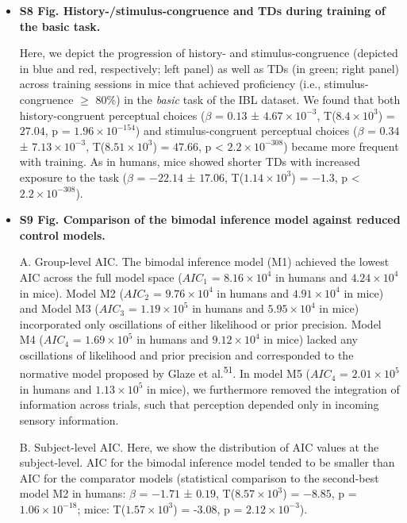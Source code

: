 \documentclass[
]{article}
\begin{document}
\begin{itemize}
\item \textbf{S8 Fig. History-/stimulus-congruence and TDs during training of the basic task.}

Here, we depict the progression of history- and stimulus-congruence
(depicted in blue and red, respectively; left panel) as well as TDs (in
green; right panel) across training sessions in mice that achieved
proficiency (i.e., stimulus-congruence \(\geq\) 80\%) in the
\emph{basic} task of the IBL dataset. We found that both
history-congruent perceptual choices (\(\beta\) = \(0.13\) ±
\(\ensuremath{4.67\times 10^{-3}}\),
T(\(\ensuremath{8.4\times 10^{3}}\)) = \(27.04\), p =
\(\ensuremath{1.96\times 10^{-154}}\)) and stimulus-congruent perceptual
choices (\(\beta\) = \(0.34\) ± \(\ensuremath{7.13\times 10^{-3}}\),
T(\(\ensuremath{8.51\times 10^{3}}\)) = \(47.66\), p < \(\ensuremath{2.2\times 10^{-308}}\)) became
more frequent with training. As in humans, mice showed shorter TDs with
increased exposure to the task (\(\beta\) = \(-22.14\) ± \(17.06\),
T(\(\ensuremath{1.14\times 10^{3}}\)) = \(-1.3\), p < \(\ensuremath{2.2\times 10^{-308}}\)).

\item \textbf{S9 Fig. Comparison of the bimodal inference model against reduced control models.}

A. Group-level AIC. The bimodal inference model (M1) achieved the lowest
AIC across the full model space (\(AIC_1\) =
\(\ensuremath{8.16\times 10^{4}}\) in humans and
\(\ensuremath{4.24\times 10^{4}}\) in mice). Model M2 (\(AIC_2\) =
\(\ensuremath{9.76\times 10^{4}}\) in humans and
\(\ensuremath{4.91\times 10^{4}}\) in mice) and Model M3 (\(AIC_3\) =
\(\ensuremath{1.19\times 10^{5}}\) in humans and
\(\ensuremath{5.95\times 10^{4}}\) in mice) incorporated only
oscillations of either likelihood or prior precision. Model M4
(\(AIC_4\) = \(\ensuremath{1.69\times 10^{5}}\) in humans and
\(\ensuremath{9.12\times 10^{4}}\) in mice) lacked any oscillations of
likelihood and prior precision and corresponded to the normative model
proposed by Glaze et al.\textsuperscript{51}. In model M5 (\(AIC_4\) =
\(\ensuremath{2.01\times 10^{5}}\) in humans and
\(\ensuremath{1.13\times 10^{5}}\) in mice), we furthermore removed the
integration of information across trials, such that perception depended
only in incoming sensory information.

B. Subject-level AIC. Here, we show the distribution of AIC values at
the subject-level. AIC for the bimodal inference model tended to be
smaller than AIC for the comparator models (statistical comparison to
the second-best model M2 in humans: \(\beta\) = \(-1.71\) ± \(0.19\),
T(\(\ensuremath{8.57\times 10^{3}}\)) = \(-8.85\), p =
\(\ensuremath{1.06\times 10^{-18}}\); mice:
T(\(\ensuremath{1.57\times 10^{3}}\)) = -3.08, p =
\(\ensuremath{2.12\times 10^{-3}}\)).


\end{itemize}
\end{document}
